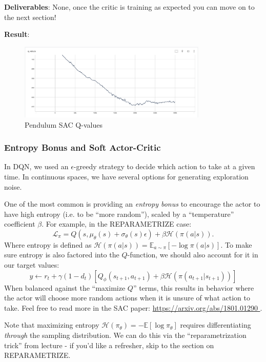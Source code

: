 \textbf{Deliverables}: None, once the critic is training as expected you can move on to the next section!

\textbf{Result}:

\begin{figure}[H]
    \centering
    \includegraphics[width=0.8\textwidth]{imgs/sac/sanity_pendulum_qvalues.png}
    \caption{Pendulum SAC Q-values}
    \label{fig:pendulum_sac_qvalues}
\end{figure}

\subsubsection{Entropy Bonus and Soft Actor-Critic}
In DQN, we used an $\epsilon$-greedy strategy to decide which action to take at a given time. In continuous spaces, we have several options for generating exploration noise.

One of the most common is providing an \textit{entropy bonus} to encourage the actor to have high entropy (i.e. to be ``more random''), scaled by a ``temperature'' coefficient $\beta$. For example, in the REPARAMETRIZE case:
\[\mathcal L_\pi = Q(s, \mu_\theta(s) + \sigma_\theta(s)\epsilon) + \beta\mathcal{H}(\pi(a|s)).\]
Where entropy is defined as $\mathcal H(\pi(a|s)) = \mathbb{E}_{a \sim \pi}\left[-\log\pi(a|s)\right]$. To make sure entropy is also factored into the $Q$-function, we should also account for it in our target values:
\[y \gets r_t + \gamma(1-d_t)\left[Q_\phi(s_{t+1}, a_{t+1}) + \beta\mathcal{H}(\pi(a_{t+1}|s_{t+1}))\right]\]
When balanced against the ``maximize $Q$'' terms, this results in behavior where the actor will choose more random actions when it is unsure of what action to take.
Feel free to read more in the SAC paper: {\url{https://arxiv.org/abs/1801.01290 }}.

Note that maximizing entropy $\mathcal{H}(\pi_\theta) = -\mathbb{E}[\log \pi_\theta]$ requires differentiating \textit{through} the sampling distribution. We can do this via the ``reparametrization trick'' from lecture - if you'd like a refresher, skip to the section on REPARAMETRIZE.


